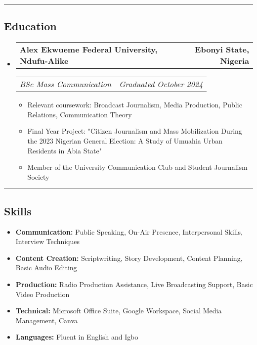 \documentclass[11pt,letterpaper]{article}
\makeatletter
\newcommand{\headerrow}[2]{
  \begin{tabular*}{\linewidth}{l@{\extracolsep{\fill}}r}
    #1 & #2 \\
  \end{tabular*}
}
\makeatother
\begin{document}
\vspace{0.2cm}
\hrule
\vspace{0.2cm}

\subsection*{Education}

\begin{itemize}[leftmargin=1em]
  \item
    \headerrow{\textbf{Alex Ekwueme Federal University, Ndufu-Alike}}{\textbf{Ebonyi State, Nigeria}}
    \headerrow{\emph{BSc Mass Communication}}{\emph{Graduated October 2024}}
    
    \begin{itemize}[leftmargin=1.5em, label=$\bullet$, itemsep=2pt]
      \item Relevant coursework: Broadcast Journalism, Media Production, Public Relations, Communication Theory
      \item Final Year Project: "Citizen Journalism and Mass Mobilization During the 2023 Nigerian General Election: A Study of Umuahia Urban Residents in Abia State"
      \item Member of the University Communication Club and Student Journalism Society
    \end{itemize}
\end{itemize}

\vspace{0.2cm}
\hrule
\vspace{0.2cm}

\subsection*{Skills}

\begin{itemize}[leftmargin=1em, itemsep=3pt, label=\textbullet]
  \item \textbf{Communication:} Public Speaking, On-Air Presence, Interpersonal Skills, Interview Techniques
  \item \textbf{Content Creation:} Scriptwriting, Story Development, Content Planning, Basic Audio Editing
  \item \textbf{Production:} Radio Production Assistance, Live Broadcasting Support, Basic Video Production
  \item \textbf{Technical:} Microsoft Office Suite, Google Workspace, Social Media Management, Canva
  \item \textbf{Languages:} Fluent in English and Igbo
\end{itemize}
\end{document}
